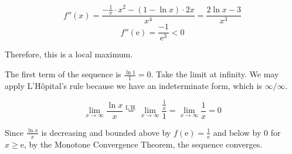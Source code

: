 \documentclass{article}
\begin{document}
\[f''(x)=\frac{-\frac1x\cdot x^2-(1-\ln x)\cdot 2x}{x^4}=\frac{2\ln x-3}{x^3}\]
\[f''(\mathrm{e})=\frac{-1}{\mathrm{e}^3}<0\]

\hfill

\noindent Therefore, this is a local maximum.

\hfill

\noindent The first term of the sequence is $\displaystyle\frac{\ln 1}1=0$. Take the limit at infinity. We may apply L'Hôpital's rule because we have an indeterminate form, which is $\infty/\infty$.

\[\lim_{x\to\infty}\frac{\ln x}{x}\overset{\text{L'H.}}{=}\lim_{x\to\infty}\frac{\frac1x}1=\lim_{x\to\infty}\frac1x=0\]

\hfill

\noindent Since $\displaystyle\frac{\ln x}x$ is decreasing and bounded above by $\displaystyle f(\mathrm{e})=\frac1{\mathrm{e}}$ and below by $0$ for $x\geq\mathrm{e}$, by the Monotone Convergence Theorem, the sequence converges.
\end{document}
